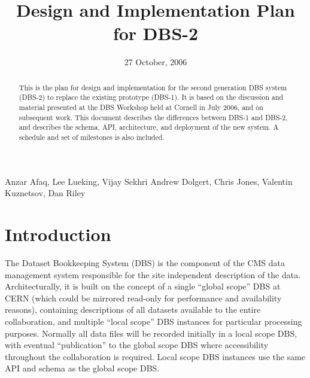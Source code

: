 \documentclass{cmspaper}
\begin{document}

\begin{titlepage}

   \date{27 October, 2006}

  \title{Design and Implementation Plan for DBS-2}

  \begin{Authlist}
  Anzar Afaq,  Lee Lueking,  Vijay Sekhri     
Andrew Dolgert,  Chris Jones,  Valentin Kuznetsov, Dan Riley

  \end{Authlist}



  \begin{abstract}
    This is the plan for design and implementation for the second generation DBS system (DBS-2) to replace the existing prototype (DBS-1). It is based on the discussion and material presented at the DBS Workshop held at Cornell in July 2006, and on subsequent work. This document describes the differences between DBS-1 and DBS-2, and describes the schema, API, architecture, and deployment of the new system. A schedule and set of milestones is also included.
 
  \end{abstract} 
  
\end{titlepage}

\setcounter{page}{2}%


%

\section{Introduction}

The Dataset Bookkeeping System (DBS) is the component of the CMS data
management system responsible for the site independent description of
the data.  Architecturally, it is built on the concept of a single
``global scope'' DBS at CERN (which could be mirrored read-only for
performance and availability reasons), containing descriptions of all
datasets available to the entire collaboration, and multiple ``local
scope'' DBS instances for particular processing purposes.  Normally
all data files will be recorded initially in a local scope DBS, with
eventual ``publication'' to the global scope DBS where accessibility
throughout the collaboration is required.  Local scope DBS instances
use the same API and schema as the global scope DBS.
\end{document}
